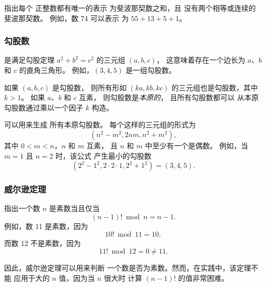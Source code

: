 指出每个
正整数都有唯一的表示
为斐波那契数之和，且
没有两个相等或连续的
斐波那契数。
例如，数 74 可以表示
为 $55+13+5+1$。

\subsubsection{勾股数}


是满足勾股定理
$a^2+b^2=c^2$ 的三元组 $(a,b,c)$，
这意味着存在一个边长为
$a$、$b$ 和 $c$ 的直角三角形。
例如，$(3,4,5)$ 是一组勾股数。

如果 $(a,b,c)$ 是勾股数，
则所有形如 $(ka,kb,kc)$
的三元组也是勾股数，其中 $k>1$。
如果 $a$、$b$ 和 $c$ 互素，
则勾股数是\emph{本原的}，
且所有勾股数都可以
从本原勾股数通过乘以一个因子 $k$ 构造。

可以用来生成
所有本原勾股数。
每个这样的三元组的形式为
\[(n^2-m^2,2nm,n^2+m^2),\]
其中 $0<m<n$，$n$ 和 $m$ 互素，
且 $n$ 和 $m$ 中至少有一个是偶数。
例如，当 $m=1$ 且 $n=2$ 时，该公式
产生最小的勾股数
\[(2^2-1^2,2\cdot2\cdot1,2^2+1^2)=(3,4,5).\]

\subsubsection{威尔逊定理}


指出一个数 $n$
是素数当且仅当
\[(n-1)! \bmod n = n-1.\]
例如，数 11 是素数，因为
\[10! \bmod 11 = 10,\]
而数 12 不是素数，因为
\[11! \bmod 12 = 0 \neq 11.\]

因此，威尔逊定理可以用来判断
一个数是否为素数。然而，在实践中，该定理不能
应用于大的 $n$ 值，因为当 $n$ 很大时
计算 $(n-1)!$ 的值非常困难。


